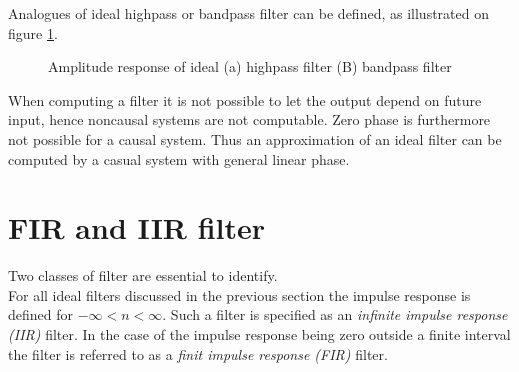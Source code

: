 Analogues of ideal highpass or bandpass filter can be defined, as illustrated on figure \ref{fig:ideal}.\\ 

\begin{figure}[H]
\begin{subfigure}[b]{0.50\textwidth}
        \centering
{}

\caption{}
    \end{subfigure}
 \begin{subfigure}[b]{0.50\textwidth}
        \centering  
{}
\caption{}
    \end{subfigure}
\caption{Amplitude response of ideal (a) highpass filter (B) bandpass filter}
\label{fig:ideal}
\end{figure}
When computing a filter it is not possible to let the output depend on future input, hence noncausal systems are not computable. Zero phase is furthermore not possible for a causal system.
Thus an approximation of an ideal filter can be computed by a casual system with general linear phase.    

\section{FIR and IIR filter} 
Two classes of filter are essential to identify.\\
For all ideal filters discussed in the previous section the impulse response is defined for $-\infty < n < \infty$. Such a filter is specified as an \textit{infinite impulse response (IIR)} filter. In the case of the impulse response being zero outside a finite interval the filter is referred to as a \textit{finit impulse response (FIR)} filter. 
